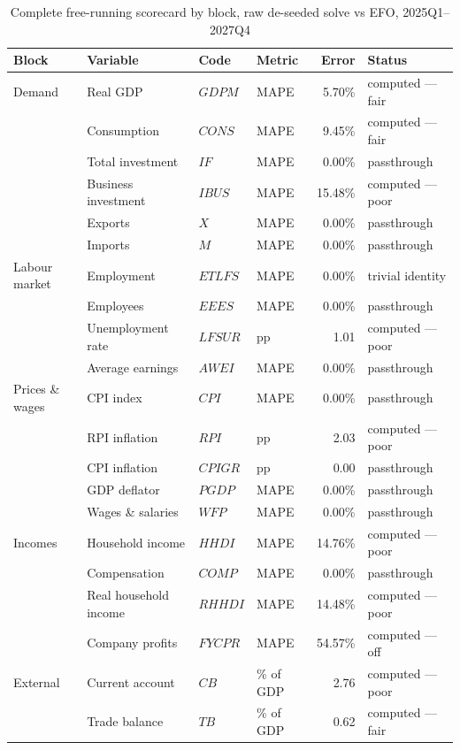 \begin{table}[ht]
\centering
\caption{Complete free-running scorecard by block, raw de-seeded solve vs EFO, 2025Q1--2027Q4}
\label{tab:fullscore}
\small
\begin{tabular}{llllrl}
\toprule
Block & Variable & Code & Metric & Error & Status \\
\midrule
Demand & Real GDP & $GDPM$ & MAPE & 5.70\% & computed --- fair \\
 & Consumption & $CONS$ & MAPE & 9.45\% & computed --- fair \\
 & Total investment & $IF$ & MAPE & 0.00\% & passthrough \\
 & Business investment & $IBUS$ & MAPE & 15.48\% & computed --- poor \\
 & Exports & $X$ & MAPE & 0.00\% & passthrough \\
 & Imports & $M$ & MAPE & 0.00\% & passthrough \\
\midrule
Labour market & Employment & $ETLFS$ & MAPE & 0.00\% & trivial identity \\
 & Employees & $EEES$ & MAPE & 0.00\% & passthrough \\
 & Unemployment rate & $LFSUR$ & pp & 1.01 & computed --- poor \\
 & Average earnings & $AWEI$ & MAPE & 0.00\% & passthrough \\
\midrule
Prices \& wages & CPI index & $CPI$ & MAPE & 0.00\% & passthrough \\
 & RPI inflation & $RPI$ & pp & 2.03 & computed --- poor \\
 & CPI inflation & $CPIGR$ & pp & 0.00 & passthrough \\
 & GDP deflator & $PGDP$ & MAPE & 0.00\% & passthrough \\
 & Wages \& salaries & $WFP$ & MAPE & 0.00\% & passthrough \\
\midrule
Incomes & Household income & $HHDI$ & MAPE & 14.76\% & computed --- poor \\
 & Compensation & $COMP$ & MAPE & 0.00\% & passthrough \\
 & Real household income & $RHHDI$ & MAPE & 14.48\% & computed --- poor \\
 & Company profits & $FYCPR$ & MAPE & 54.57\% & computed --- off \\
\midrule
External & Current account & $CB$ & \% of GDP & 2.76 & computed --- poor \\
 & Trade balance & $TB$ & \% of GDP & 0.62 & computed --- fair \\
\bottomrule
\end{tabular}


\end{table}
